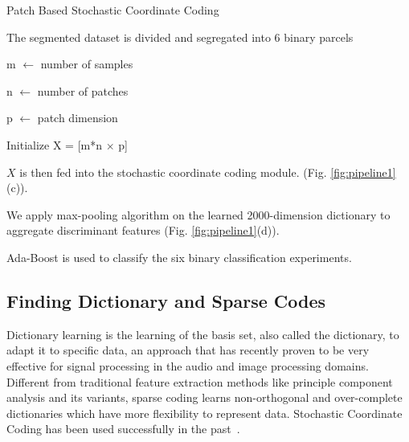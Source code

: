 \begin{algorithm}
	\vspace{1em}
	\caption{Patch Based Stochastic Coordinate Coding}\label{alg:pipeline1}
	
	
	
	The segmented dataset is divided and segregated into 6 binary parcels
	
	 {
		
		m $ \gets $ number of samples
		
		n $ \gets $ number of patches
		
		p $ \gets $ patch dimension
		
		Initialize X = [m*n $ \times $ p]

	$ X $ is then fed into the stochastic coordinate coding module. (Fig. \ref{fig:pipeline1}(c)).
	
	We apply max-pooling algorithm on the learned 2000-dimension dictionary to aggregate discriminant features (Fig. \ref{fig:pipeline1}(d)).
	
	Ada-Boost is used to classify the six binary classification experiments. 
	}
\end{algorithm}


\subsection{Finding Dictionary and Sparse Codes}
\label{sec:dictionary_learning}
Dictionary learning is the learning of the basis set, also called the dictionary, to adapt it to specific data, an approach that has recently proven to be very effective for signal processing in the audio and image processing domains. Different from traditional feature extraction methods like principle component analysis and its variants, sparse coding learns non-orthogonal and over-complete dictionaries which have more flexibility to represent data. Stochastic Coordinate Coding  has been used successfully in the past~\citep{lin2014stochastic,mairal2009online}.


